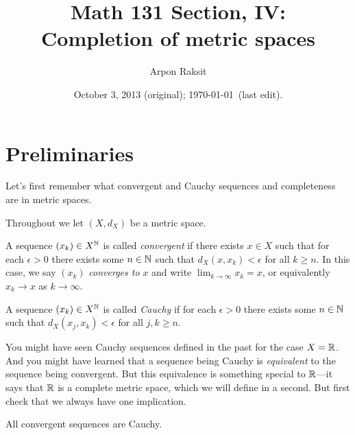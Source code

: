 


\title{Math 131 Section, IV:\\Completion of metric spaces}
\author{Arpon Raksit}
\date{October 3, 2013 (original); \today\ (last edit).}


\maketitle
\thispagestyle{fancy}


\section{Preliminaries}

Let's first remember what convergent and Cauchy sequences and
completeness are in metric spaces.

\begin{notation}
  Throughout we let $(X,d_X)$ be a metric space.
\end{notation}

\begin{definition}
  A sequence $(x_k) \in X^{\mathbb{N}}$ is called \textit{convergent} if there
  exists $x \in X$ such that for each $\epsilon > 0$ there exists some
  $n \in \mathbb{N}$ such that $d_X(x,x_k) < \epsilon$ for all $k \ge n$. In
  this case, we say $(x_k)$ \textit{converges to} $x$ and write
  $\lim_{k \to \infty} x_k = x$, or equivalently $x_k \to x$ as $k \to
  \infty$.
\end{definition}

\begin{definition}
  A sequence $(x_k) \in X^{\mathbb{N}}$ is called \textit{Cauchy} if for each
  $\epsilon > 0$ there exists some $n \in \mathbb{N}$ such that $d_X(x_j,x_k)
  < \epsilon$ for all $j,k \ge n$.
\end{definition}

\begin{nothing}
  You might have seen Cauchy sequences defined in the past for the
  case $X = \mathbb{R}$. And you might have learned that a sequence being
  Cauchy is \textit{equivalent} to the sequence being convergent. But
  this equivalence is something special to $\mathbb{R}$---it says that $\mathbb{R}$ is
  a complete metric space, which we will define in a second. But first
  check that we always have one implication.
\end{nothing}

\begin{exercise}
  \label{convergentcauchy}
  All convergent sequences are Cauchy.
\end{exercise}

